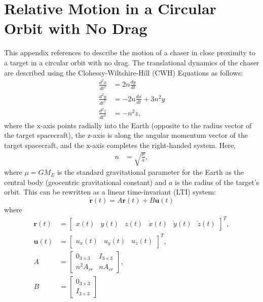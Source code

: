 \appendices{}

\section{Relative Motion in a Circular Orbit with No Drag} \label{app:cwh-equations}
This appendix references \cite{clohessy1960terminal} to describe the motion of a chaser in close proximity to a target in a circular orbit with no drag.
The translational dynamics of the chaser are described using the Clohessy-Wiltshire-Hill (CWH) Equations as follows:
\begin{subequations}
\begin{align}
    \frac{d^2x}{dt^2}&=2n\frac{dy}{dt}\\
    \frac{d^2y}{dt^2}&=-2n\frac{dx}{dt}+3n^2y\\
    \frac{d^2z}{dt^2}&=-n^2z,
\end{align}
\end{subequations}
where the x-axis points radially into the Earth (opposite to the radius vector of the target spacecraft), the z-axis is along the angular momentum vector of the target spacecraft, and the x-axis completes the right-handed system.
Here,
\begin{align}
    n&=\sqrt{\frac{\mu}{a}},
\end{align}
where $\mu=GM_E$ is the standard gravitational parameter for the Earth as the central body (geocentric gravitational constant) and $a$ is the radius of the target's orbit.
This can be rewritten as a linear time-invariant (LTI) system:
\begin{equation}
    \dot{\boldsymbol{r}}(t)=A\boldsymbol{r}(t)+B\boldsymbol{u}(t)
\end{equation}
where
\begin{subequations}
\begin{align}
    \boldsymbol{r}(t)&=\begin{bmatrix}
    x(t)&y(t)&z(t)&\dot{x}(t)&\dot{y}(t)&\dot{z}(t)
    \end{bmatrix}^T,\\
    \boldsymbol{u}(t)&=\begin{bmatrix}
    u_x(t)&u_y(t)&u_z(t)
    \end{bmatrix}^T,\\
    A&=\begin{bmatrix}
        0_{3\times3}&I_{3\times3}\\
        n^2A_{\dot{r}r}&nA_{\dot{r}\dot{r}}
    \end{bmatrix},\\
    B&=\begin{bmatrix}
        0_{3\times3}\\
        I_{3\times3}
    \end{bmatrix}
\end{align}
\end{subequations}
